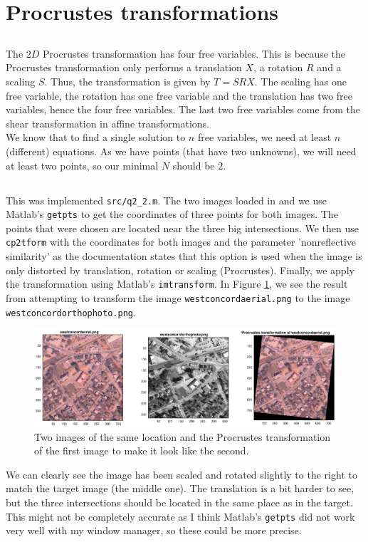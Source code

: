 \documentclass[a4paper]{article}
\begin{document}
\section{Procrustes transformations}
\subsection{}
The $2D$ Procrustes transformation has four free variables. This is because the Procrustes transformation only performs a translation $X$, a rotation $R$ and a scaling $S$. Thus, the transformation is given by $T=SRX$. The scaling has one free variable, the rotation has one free variable and the translation has two free variables, hence the four free variables. The last two free variables come from the shear transformation in affine transformations. \\
We know that to find a single solution to $n$ free variables, we need at least $n$ (different) equations. As we have points (that have two unknowns), we will need at least two points, so our minimal $N$ should be $2$.

\subsection{}
This was implemented \texttt{src/q2\_2.m}. The two images loaded in and we use Matlab's \texttt{getpts} to get the coordinates of three points for both images. The points that were chosen are located near the three big intersections. We then use \texttt{cp2tform} with the coordinates for both images and the parameter 'nonreflective similarity' as the documentation states that this option is used when the image is only distorted by translation, rotation or scaling (Procrustes). Finally, we apply the transformation using Matlab's \texttt{imtransform}. In Figure \ref{fig2}, we see the result from attempting to transform the image \texttt{westconcordaerial.png} to the image \texttt{westconcordorthophoto.png}.
\begin{figure}[H]
  \centering
  \captionsetup{justification=centering}
  \includegraphics[width=\textwidth]{fig2.eps}
  \caption{Two images of the same location and the Procrustes transformation of the first image to make it look like the second.}
  \label{fig2}
\end{figure}
We can clearly see the image has been scaled and rotated slightly to the right to match the target image (the middle one). The translation is a bit harder to see, but the three intersections should be located in the same place as in the target. This might not be completely accurate as I think Matlab's \texttt{getpts} did not work very well with my window manager, so these could be more precise.
\end{document}
